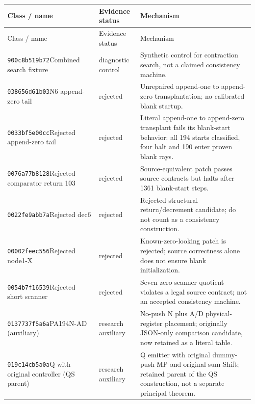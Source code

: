 {\small
\begin{longtable}{@{}>{\raggedright\arraybackslash}p{}>{\raggedright\arraybackslash}p{}>{\raggedright\arraybackslash}p{}@{}}
\toprule Class / name & Evidence status & Mechanism\\\midrule\endfirsthead
\toprule Class / name & Evidence status & Mechanism\\\midrule\endhead
\texttt{900c8b519b72}\newline Combined search fixture & diagnostic control & Synthetic control for contraction search, not a claimed consistency machine.\\
\texttt{038656d61b03}\newline N6 append-zero tail & rejected & Unrepaired append-one to append-zero transplantation; no calibrated blank startup.\\
\texttt{0033bf5e00cc}\newline Rejected append-zero tail & rejected & Literal append-one to append-zero transplant fails its blank-start behavior: all 194 starts classified, four halt and 190 enter proven blank rays.\\
\texttt{0076a77b8128}\newline Rejected comparator return 103 & rejected & Source-equivalent patch passes source contracts but halts after 1361 blank-start steps.\\
\texttt{0022fe9abb7a}\newline Rejected dec6 & rejected & Rejected structural return/decrement candidate; do not count as a consistency construction.\\
\texttt{00002feec556}\newline Rejected node1-X & rejected & Known-zero-looking patch is rejected; source correctness alone does not ensure blank initialization.\\
\texttt{0054b7f16539}\newline Rejected short scanner & rejected & Seven-zero scanner quotient violates a legal source contract; not an accepted consistency machine.\\
\texttt{0137737f5a6a}\newline PA194N-AD (auxiliary) & research auxiliary & No-push N plus A/D physical-register placement; originally JSON-only comparison candidate, now retained as a literal table.\\
\texttt{019c14cb5a0a}\newline Q with original controller (QS parent) & research auxiliary & Q emitter with original dummy-push MP and original sum Shift; retained parent of the QS construction, not a separate principal theorem.\\

\end{longtable}}
